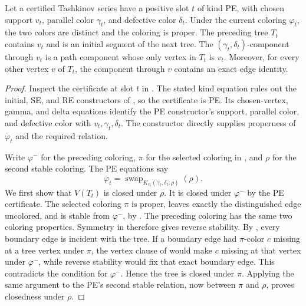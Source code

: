 \begin{helper}
Let a certified Tashkinov series have a positive slot \(t\) of kind PE,
with chosen support \(v_t\), parallel color \(\gamma_t\), and defective
color \(\delta_t\).  Under the current coloring \(\varphi_t\), the two
colors are distinct and the coloring is proper.  The preceding tree
\(T_t\) contains \(v_t\) and is an initial segment of the next tree.
The \((\gamma_t,\delta_t)\)-component through \(v_t\) is a path
component whose only vertex in \(T_t\) is \(v_t\).  Moreover, for every
other vertex \(v\) of \(T_t\), the component through \(v\) contains an
exact edge identity.
\end{helper}
\begin{proof}
Inspect the certificate at slot \(t\) in .
The stated kind equation rules out the initial, SE, and RE constructors
of , so the certificate is PE.  Its
chosen-vertex, gamma, and delta equations identify the PE constructor's
support, parallel color, and defective color with
\(v_t,\gamma_t,\delta_t\).  The constructor directly supplies
properness of \(\varphi_t\) and the required
 relation.

Write \(\varphi^-\) for the preceding coloring, \(\pi\) for the
selected coloring in , and \(\rho\) for
the second stable coloring.  The PE equations say
\[
  \varphi_t=\operatorname{swap}_{K_{v_t}(\gamma_t,\delta_t;\rho)}(\rho).
  \tag{1}
\]
We first show that \(V(T_t)\) is closed under \(\rho\).  It is closed
under \(\varphi^-\) by the PE certificate.  The selected coloring
\(\pi\) is proper, leaves exactly the distinguished edge uncolored, and
is stable from \(\varphi^-\), by
.  The preceding coloring has the same
two coloring properties.  Symmetry in  therefore gives
reverse stability.  By , every boundary edge is
incident with the tree.  If a boundary edge had \(\pi\)-color \(c\) missing
at a tree vertex under \(\pi\), the vertex clause of
 would make \(c\) missing at that vertex under
\(\varphi^-\), while reverse stability would fix that exact boundary
edge.  This contradicts the  condition
for \(\varphi^-\).  Hence the tree is closed under \(\pi\).  Applying
the same argument to the PE's second stable relation, now between
\(\pi\) and \(\rho\), proves closedness under \(\rho\).


\end{proof}
